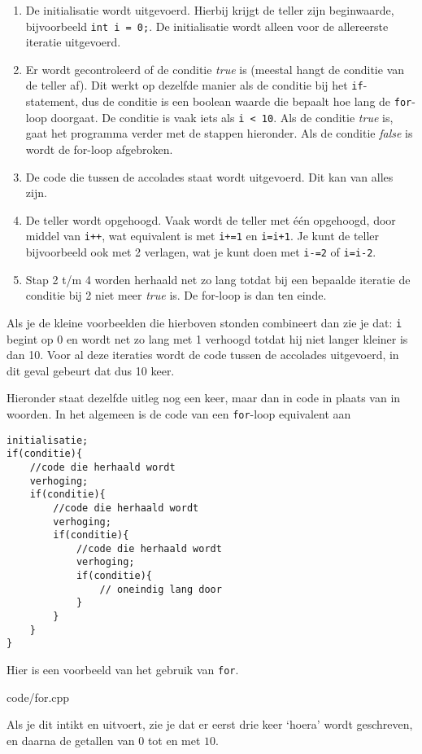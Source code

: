 \documentclass[12pt,a4paper]{article}
\newcommand{\code}{}
\newcommand{\icode}{\lstinline}
\begin{document}
\begin{enumerate}
	\item De initialisatie wordt uitgevoerd. Hierbij krijgt de teller zijn beginwaarde, bijvoorbeeld \icode{int i = 0;}. De initialisatie wordt alleen voor de allereerste iteratie uitgevoerd. 
	\item Er wordt gecontroleerd of de conditie \emph{true} is (meestal hangt de conditie van de teller af). Dit werkt op dezelfde manier als de conditie bij het \icode{if}-statement, dus de conditie is een boolean waarde die bepaalt hoe lang de \icode{for}-loop doorgaat. De conditie is vaak iets als \icode{i < 10}. Als de conditie \emph{true} is, gaat het programma verder met de stappen hieronder. Als de conditie \emph{false} is wordt de for-loop afgebroken. 
	\item De code die tussen de accolades staat wordt uitgevoerd. Dit kan van alles zijn. 
	\item De teller wordt opgehoogd. Vaak wordt de teller met \'e\'en opgehoogd, door middel van \icode{i++}, wat equivalent is met \icode{i+=1} en \icode{i=i+1}. Je kunt de teller bijvoorbeeld ook met 2 verlagen, wat je kunt doen met \icode{i-=2} of \icode{i=i-2}.
	\item Stap 2 t/m 4 worden herhaald net zo lang totdat bij een bepaalde iteratie de conditie bij 2 niet meer \emph{true} is. De for-loop is dan ten einde. 
\end{enumerate}

Als je de kleine voorbeelden die hierboven stonden combineert dan zie je dat: \icode{i} begint op 0 en wordt net zo lang met 1 verhoogd totdat hij niet langer kleiner is dan 10. Voor al deze iteraties wordt de code tussen de accolades uitgevoerd, in dit geval gebeurt dat dus 10 keer. 

Hieronder staat dezelfde uitleg nog een keer, maar dan in code in plaats van in woorden. In het algemeen is de code van een \icode{for}-loop equivalent aan
\begin{lstlisting}
initialisatie;
if(conditie){
	//code die herhaald wordt
	verhoging;
	if(conditie){
		//code die herhaald wordt
		verhoging;
		if(conditie){
			//code die herhaald wordt
			verhoging;
			if(conditie){
				// oneindig lang door
			}
		}
	}
}
\end{lstlisting}
Hier is een voorbeeld van het gebruik van \icode{for}.

\code{code/for.cpp}

Als je dit intikt en uitvoert, zie je dat er eerst drie keer `hoera' wordt geschreven, en daarna de getallen van $0$ tot en met $10$.
\end{document}
